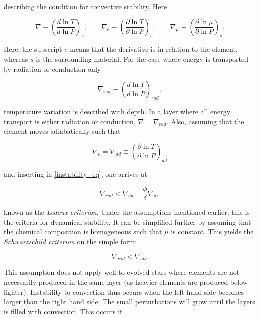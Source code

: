 \noindent describing the condition for convective stability. Here

\begin{equation}
    \nabla \equiv \left(\frac{d \ln T}{d \ln P}\right)_s, \qquad \nabla_e \equiv \left(\frac{\partial \ln T}{\partial \ln P}\right)_e, \qquad \nabla_\mu \equiv \left(\frac{\partial \ln \mu}{\partial \ln P}\right)_s.
\end{equation}

\noindent Here, the subscript $e$ means that the derivative is in relation to the element, whereas $s$ is the surrounding material. %
For the case where energy is transported by radiation or conduction only

\begin{equation}
    \nabla_{rad} \equiv \left(\frac{d \ln T}{d \ln P}\right)_{rad}, 
\end{equation}

\noindent temperature variation is described with depth. In a layer where all energy transport is either radiation or conduction, $\nabla = \nabla_{rad}$. Also, assuming that the element moves adiabatically such that 

\begin{equation}
\label{stability}
    \nabla_e = \nabla_{ad} \equiv \left(\frac{\partial \ln T}{\partial \ln P}\right)_{ad}
\end{equation}

\noindent and inserting in \eqref{instability_eq}, one arrives at

\begin{equation}
\label{stability2}
    \nabla_{rad} < \nabla_{ad} + \frac{\phi}{\delta} \nabla_\mu,
\end{equation}

known as the \textit{Ledoux criterion}. Under the assumptions mentioned earlier, this is the criteria for dynamical stability. It can be simplified further by assuming that the chemical composition is homogeneous such that $\mu$ is constant. This yields the \textit{Schwarzschild criterion} on the simple form:

\begin{equation}
\label{stability3}
    \nabla_{rad} < \nabla_{ad}.
\end{equation}

\noindent This assumption does not apply well to evolved stars where elements are not necessarily produced in  the same layer (as heavier elements are produced below lighter). 
Instability to convection thus occurs when the left hand side becomes larger than the right hand side. The small perturbations will grow until the layers is filled with convection. This occurs if


